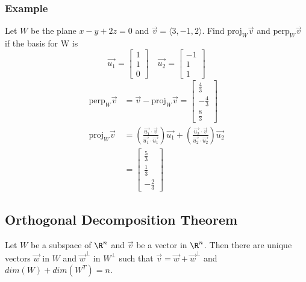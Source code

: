 \documentclass{math}
\begin{document}
\subsubsection*{Example}
Let \( W \) be the plane \( x-y+2z = 0 \) and \( \vec{v} = \langle3,-1,2\rangle
\). Find \( \text{proj}_{W}\vec{v} \) and \( \text{perp}_{W}\vec{v} \) if the
basis for W is
\[ \vec{u_1} = \begin{bmatrix}1 \\ 1 \\ 0\end{bmatrix} \quad
  \vec{u_2} = \begin{bmatrix}-1 \\ 1 \\ 1\end{bmatrix} \]
\begin{align*}
  \text{perp}_{W}\vec{v} &= \vec{v}-\text{proj}_{W}\vec{v} = \begin{bmatrix}
    \frac{4}{3} \\ -\frac{4}{3} \\ \frac{8}{3}\end{bmatrix} \\
  \text{proj}_{W}\vec{v} &=
    \left(\frac{\vec{u_1}\cdot\vec{v}}{\vec{u_1}\cdot\vec{u_1}}\right)\vec{u_1}+
    \left(\frac{\vec{u_2}\cdot\vec{v}}{\vec{u_2}\cdot\vec{u_2}}\right)\vec{u_2}
    \\
  &= \begin{bmatrix}
    \frac{5}{3} \\ \frac{1}{3} \\ -\frac{2}{3}
  \end{bmatrix}
\end{align*}

\subsection*{Orthogonal Decomposition Theorem}
Let \( W \) be a subspace of \( \R^n \) and \( \vec{v} \) be a vector in
\( \R^n \). Then there are unique vectors \( \vec{w} \) in \( W \) and
\( \vec{w}^{\bot} \) in \( W^{\bot} \) such that \( \vec{v} =
\vec{w}+\vec{w}^{\bot} \) and \( dim(W)+dim(W^T) = n \).
\end{document}
